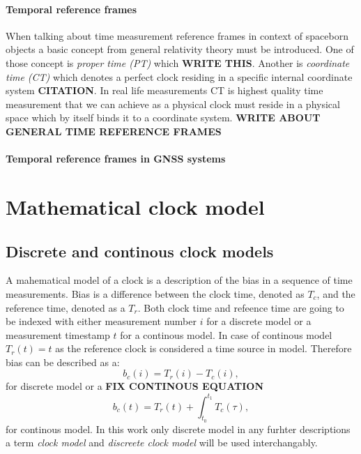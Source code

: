 \paragraph{Temporal reference frames}
When talking about time measurement reference frames in context of spaceborn objects a basic
concept from general relativity theory must be introduced.
One of those concept is \emph{proper time (PT)} which \textbf{WRITE THIS}.
Another is \emph{coordinate time (CT)} which denotes a perfect clock residing in a specific 
internal coordinate system \textbf{CITATION}.
In real life measurements CT is highest quality time measurement that we can achieve as a 
physical clock must reside in a physical space which by itself binds it to a coordinate system.
\textbf{WRITE ABOUT GENERAL TIME REFERENCE FRAMES}

\paragraph{Temporal reference frames in GNSS systems}


\section{Mathematical clock model}

\subsection{Discrete and continous clock models}
A mahematical model of a clock is a description of the bias in a sequence of time measurements.
Bias is a difference between the clock time, denoted as $T_{c}$, and the reference time,
denoted as a $T_{r}$. Both clock time and refeence time are going to be indexed with either
measurement number $i$ for a discrete model or a measurement timestamp  $t$ for a continous 
model. In case of continous model $T_{r}(t)=t$ as the reference clock is considered a
time source in model. Therefore bias can be described as a:
\begin{equation}
	b_{c}(i) = T_{r}(i) - T_{c}(i),
\end{equation}
for discrete model or a \textbf{FIX CONTINOUS EQUATION}
\begin{equation}
	b_{c}(t) = T_{r}(t) + \int_{t_0}^{t_1}T_{c}(\tau),
\end{equation}
for continous model.
In this work only discrete model in any furhter descriptions a term \emph{clock model} and
\emph{discreete clock model} will be used interchangably.



